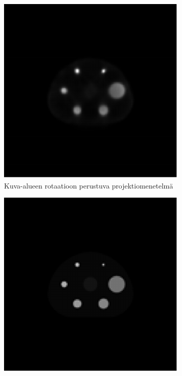 \begin{figure}[H]
    \centering
    \captionsetup{width=.9\linewidth}
    \begin{subfigure}[t]{.25\textwidth}
        \includegraphics[width=\linewidth]{kuvat/nema_rekonstruktio_proj6.pdf}
        \caption{Kuva-alueen rotaatioon perustuva projektiomenetelmä}
    \end{subfigure}%
    \hspace{.075\textwidth}%
    \begin{subfigure}[t]{.25\textwidth}
        \includegraphics[width=\linewidth]{kuvat/nema_ground_truth.pdf}

\end{subfigure}
\end{figure}
